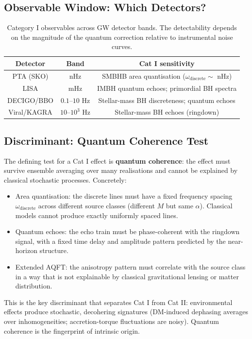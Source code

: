 \documentclass[11pt]{article}
\begin{document}
\subsection{Observable Window: Which Detectors?}

\begin{table}[h]
\centering
\begin{tabular}{c c c}
\hline\hline
Detector & Band & Cat I sensitivity \\
\hline
PTA (SKO) & nHz & SMBHB area quantisation ($\omega_{\mathrm{discrete}} \sim$ nHz) \\
LISA & mHz & IMBH quantum echoes; primordial BH spectra \\
DECIGO/BBO & $0.1$--$10$ Hz & Stellar-mass BH discreteness; quantum echoes \\
Viral/KAGRA & $10$--$10^3$ Hz & Stellar-mass BH echoes (ringdown) \\
\hline\hline
\end{tabular}
\caption{Category I observables across GW detector bands. The detectability depends on the magnitude of the quantum correction relative to instrumental noise curves.}
\end{table}

\subsection{Discriminant: Quantum Coherence Test}

The defining test for a Cat I effect is \textbf{quantum coherence}: the effect must survive ensemble averaging over many realisations and cannot be explained by classical stochastic processes. Concretely:
\begin{itemize}
\item Area quantisation: the discrete lines must have a fixed frequency spacing $\omega_{\mathrm{discrete}}$ across different source classes (different $M$ but same $\alpha$). Classical models cannot produce exactly uniformly spaced lines.
\item Quantum echoes: the echo train must be phase-coherent with the ringdown signal, with a fixed time delay and amplitude pattern predicted by the near-horizon structure.
\item Extended AQFT: the anisotropy pattern must correlate with the source class in a way that is not explainable by classical gravitational lensing or matter distribution.
\end{itemize}

This is the key discriminant that separates Cat I from Cat II: environmental effects produce stochastic, decohering signatures (DM-induced dephasing averages over inhomogeneities; accretion-torque fluctuations are noisy). Quantum coherence is the fingerprint of intrinsic origin.
\end{document}

